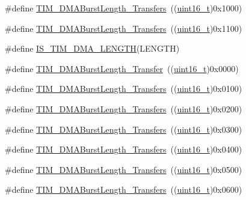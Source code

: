 \begin{DoxyCompactItemize}
\#define \hyperlink{group___t_i_m___d_m_a___burst___length_ga5b2c97f650a3c1726965187d852b8cc5}{T\+I\+M\+\_\+\+D\+M\+A\+Burst\+Length\+\_\+Transfers}~((\hyperlink{_p_e___types_8h_a1f1825b69244eb3ad2c7165ddc99c956}{uint16\+\_\+t})0x1000)
\item 
\#define \hyperlink{group___t_i_m___d_m_a___burst___length_gaed9f2afef174079f6eb6927abd995b9b}{T\+I\+M\+\_\+\+D\+M\+A\+Burst\+Length\+\_\+Transfers}~((\hyperlink{_p_e___types_8h_a1f1825b69244eb3ad2c7165ddc99c956}{uint16\+\_\+t})0x1100)
\item 
\#define \hyperlink{group___t_i_m___d_m_a___burst___length_gafd09cf0887b01a15101ba7dd6e2b4ba7}{I\+S\+\_\+\+T\+I\+M\+\_\+\+D\+M\+A\+\_\+\+L\+E\+N\+G\+TH}(L\+E\+N\+G\+TH)
\item 
\#define \hyperlink{group___t_i_m___d_m_a___burst___length_gab87f91f1c5583b9888cb6bb37fc639e2}{T\+I\+M\+\_\+\+D\+M\+A\+Burst\+Length\+\_\+Transfer}~((\hyperlink{_p_e___types_8h_a1f1825b69244eb3ad2c7165ddc99c956}{uint16\+\_\+t})0x0000)
\item 
\#define \hyperlink{group___t_i_m___d_m_a___burst___length_ga829504c3e8c90a9445f6a223bc3034f8}{T\+I\+M\+\_\+\+D\+M\+A\+Burst\+Length\+\_\+Transfers}~((\hyperlink{_p_e___types_8h_a1f1825b69244eb3ad2c7165ddc99c956}{uint16\+\_\+t})0x0100)
\item 
\#define \hyperlink{group___t_i_m___d_m_a___burst___length_ga3a99863a0925e0cc9a11b91aade66f11}{T\+I\+M\+\_\+\+D\+M\+A\+Burst\+Length\+\_\+Transfers}~((\hyperlink{_p_e___types_8h_a1f1825b69244eb3ad2c7165ddc99c956}{uint16\+\_\+t})0x0200)
\item 
\#define \hyperlink{group___t_i_m___d_m_a___burst___length_ga84bfeb309593a1ac580e233bf7514b36}{T\+I\+M\+\_\+\+D\+M\+A\+Burst\+Length\+\_\+Transfers}~((\hyperlink{_p_e___types_8h_a1f1825b69244eb3ad2c7165ddc99c956}{uint16\+\_\+t})0x0300)
\item 
\#define \hyperlink{group___t_i_m___d_m_a___burst___length_ga44f8aa51fbe8887a5f3c37a0e776902c}{T\+I\+M\+\_\+\+D\+M\+A\+Burst\+Length\+\_\+Transfers}~((\hyperlink{_p_e___types_8h_a1f1825b69244eb3ad2c7165ddc99c956}{uint16\+\_\+t})0x0400)
\item 
\#define \hyperlink{group___t_i_m___d_m_a___burst___length_ga8be40a21654eea72e9c1bf9922675b22}{T\+I\+M\+\_\+\+D\+M\+A\+Burst\+Length\+\_\+Transfers}~((\hyperlink{_p_e___types_8h_a1f1825b69244eb3ad2c7165ddc99c956}{uint16\+\_\+t})0x0500)
\item 
\#define \hyperlink{group___t_i_m___d_m_a___burst___length_gaf2ae83bd73b0e92b73e5ebfc11f9bfad}{T\+I\+M\+\_\+\+D\+M\+A\+Burst\+Length\+\_\+Transfers}~((\hyperlink{_p_e___types_8h_a1f1825b69244eb3ad2c7165ddc99c956}{uint16\+\_\+t})0x0600)

\end{DoxyCompactItemize}
